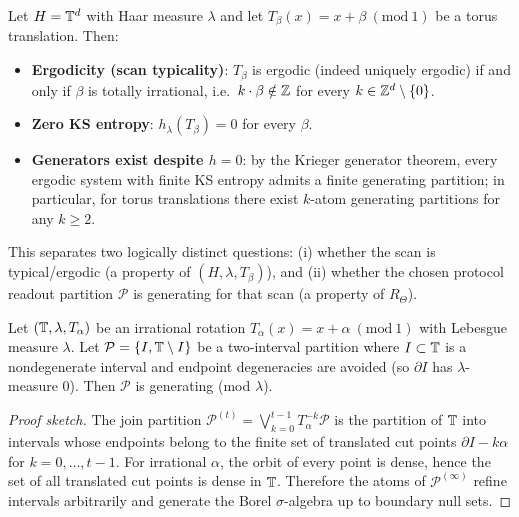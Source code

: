 \begin{proposition}\label{prop:torus-scan-generators}
Let $H=\mathbb{T}^d$ with Haar measure $\lambda$ and let $T_\beta(x)=x+\beta\ (\mathrm{mod}\ 1)$ be a torus translation.
Then:
\begin{itemize}[leftmargin=*,itemsep=2pt]
  \item \textbf{Ergodicity (scan typicality)}: $T_\beta$ is ergodic (indeed uniquely ergodic) if and only if $\beta$ is totally irrational, i.e.\ $k\cdot \beta\notin\mathbb{Z}$ for every $k\in\mathbb{Z}^d\setminus\{0\}$.
  \item \textbf{Zero KS entropy}: $h_\lambda(T_\beta)=0$ for every $\beta$.
  \item \textbf{Generators exist despite $h=0$}: by the Krieger generator theorem, every ergodic system with finite KS entropy admits a finite generating partition; in particular, for torus translations there exist $k$-atom generating partitions for any $k\ge 2$.
\end{itemize}
This separates two logically distinct questions: (i) whether the scan is typical/ergodic (a property of $(H,\lambda,T_\beta)$), and (ii) whether the chosen protocol readout partition $\mathcal{P}$ is generating for that scan (a property of $R_\Theta$).\cite{Walters1982,Krieger1970}
\end{proposition}

\begin{proposition}\label{prop:ring-factor-generator}
Let \((\mathbb{T},\lambda,T_\alpha)\) be an irrational rotation \(T_\alpha(x)=x+\alpha\ (\mathrm{mod}\ 1)\) with Lebesgue measure \(\lambda\).
Let \(\mathcal{P}=\{I,\mathbb{T}\setminus I\}\) be a two-interval partition where \(I\subset\mathbb{T}\) is a nondegenerate interval and endpoint degeneracies are avoided (so \(\partial I\) has \(\lambda\)-measure \(0\)).
Then \(\mathcal{P}\) is generating (mod \(\lambda\)).
\end{proposition}

\begin{proof}[Proof sketch]
The join partition \(\mathcal{P}^{(t)}=\bigvee_{k=0}^{t-1}T_\alpha^{-k}\mathcal{P}\) is the partition of \(\mathbb{T}\) into intervals whose endpoints belong to the finite set of translated cut points \(\partial I - k\alpha\) for \(k=0,\dots,t-1\).
For irrational \(\alpha\), the orbit of every point is dense, hence the set of all translated cut points is dense in \(\mathbb{T}\).
Therefore the atoms of \(\mathcal{P}^{(\infty)}\) refine intervals arbitrarily and generate the Borel \(\sigma\)-algebra up to boundary null sets.\cite{Walters1982,Petersen1983}
\end{proof}

